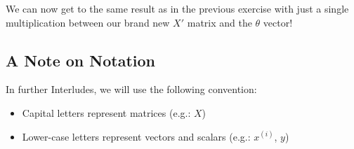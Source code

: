 We can now get to the same result as in the previous exercise with just a single multiplication between our brand new $X'$ matrix and the $\theta$ vector!

\subsection*{A Note on Notation}
In further Interludes, we will use the following convention:  
\begin{itemize}
    \item Capital letters represent matrices (e.g.: $X$)
    \item Lower-case letters represent vectors and scalars (e.g.: $x^{(i)}$, $y$)
\end{itemize}